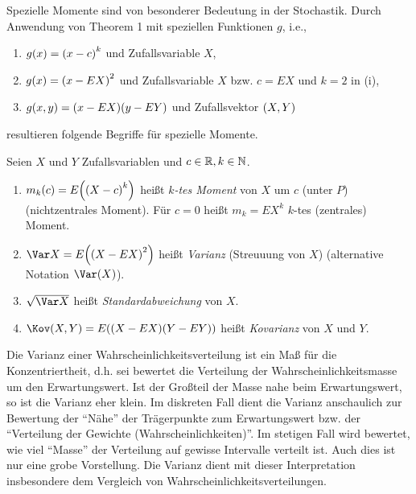 \documentclass{lecture}
\begin{document}
    Spezielle Momente sind von besonderer Bedeutung in der Stochastik.
    Durch Anwendung von Theorem 1 mit speziellen Funktionen \(g\), i.e.,
    \begin{enumerate}
        \item \(g\parentheses*{x} = \parentheses*{x - c}^k\) und Zufallsvariable \(X\),
        \item \(g\parentheses*{x} = \parentheses*{x - EX}^2\) und Zufallsvariable \(X\) bzw. \(c = EX\) und \(k = 2\) in (i),
        \item \(g\parentheses*{x, y} = \parentheses*{x- EX}\parentheses*{y - EY}\) und Zufallsvektor \(\parentheses*{X, Y}\)
    \end{enumerate}
    resultieren folgende Begriffe für spezielle Momente.
    
    \begin{definition}
        Seien \(X\) und \(Y\) Zufallsvariablen und \(c \in \R, k \in \N\).
        \begin{enumerate}
            \item \(m_k\parentheses*{c} = E\parentheses*{\parentheses*{X - c}^k}\) heißt \emph{\(k\)-tes Moment} von \(X\) um \(c\) (unter \(P\)) (nichtzentrales Moment).
            Für \(c = 0\) heißt \(m_k = EX^k\) \(k\)-tes (zentrales) Moment.
            \item \(\Var X = E\parentheses*{\parentheses*{X - EX}^2}\) heißt \emph{Varianz} (Streuuung von \(X\)) (alternative Notation \(\Var\parentheses*{X}\)).
            \item \(\sqrt{\Var X}\) heißt \emph{Standardabweichung} von \(X\).
            \item \(\Kov\parentheses*{X, Y} = E\parentheses*{\parentheses*{X - EX}\parentheses*{Y - EY}}\) heißt \emph{Kovarianz} von \(X\) und \(Y\).
        \end{enumerate}
    \end{definition}
    
    Die Varianz einer Wahrscheinlichkeitsverteilung ist ein Maß für die Konzentriertheit, d.h. sei bewertet die Verteilung der Wahrscheinlichkeitsmasse um den Erwartungswert.
    Ist der Großteil der Masse nahe beim Erwartungswert, so ist die Varianz eher klein.
    Im diskreten Fall dient die Varianz anschaulich zur Bewertung der ``Nähe'' der Trägerpunkte zum Erwartungswert bzw. der ``Verteilung der Gewichte (Wahrscheinlichkeiten)''.
    Im stetigen Fall wird bewertet, wie viel ``Masse'' der Verteilung auf gewisse Intervalle verteilt ist.
    Auch dies ist nur eine grobe Vorstellung.
    Die Varianz dient mit dieser Interpretation insbesondere dem Vergleich von Wahrscheinlichkeitsverteilungen.
    
\end{document}
